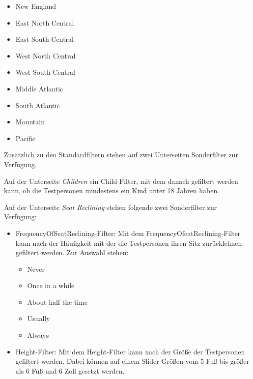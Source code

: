 \documentclass{mi-seminar}
\begin{document}
\begin{itemize}
	\begin{itemize}
	\item New England
	\item East North Central
	\item East South Central
	\item West North Central
	\item West South Central
	\item Middle Atlantic
	\item South Atlantic
	\item Mountain
	\item Pacific
	\end{itemize}
\end{itemize}

Zusätzlich zu den Standardfiltern stehen auf zwei Unterseiten Sonderfilter zur Verfügung. 

Auf der Unterseite \textit{Children} ein Child-Filter, mit dem danach gefiltert werden kann, ob die Testpersonen mindestens ein Kind unter 18 Jahren haben. 

Auf der Unterseite \textit{Seat Reclining} stehen folgende zwei Sonderfilter zur Verfügung: 
\begin{itemize}
\item FrequencyOfSeatReclining-Filter: Mit dem FrequencyOfeatReclining-Filter kann nach der Häufigkeit mit der die Testpersonen ihren Sitz zurücklehnen gefiltert werden. Zur Auswahl stehen:
	\begin{itemize}
	\item Never
	\item Once in a while
	\item About half the time
	\item Usually
	\item Always
	\end{itemize}
\item Height-Filter: Mit dem Height-Filter kann nach der Größe der Testpersonen gefiltert werden. Dabei können auf einem Slider Größen vom 5 Fuß bis größer als 6 Fuß und 6 Zoll gesetzt werden.
\end{itemize} 
\end{document}
